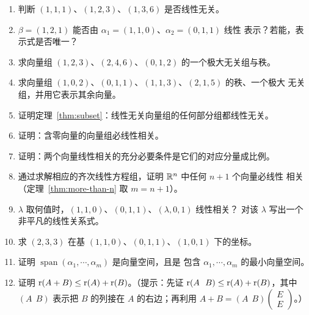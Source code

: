 \begin{enumerate}[label=\arabic*., itemsep=2pt]
\item 判断 $(1,1,1)$、$(1,2,3)$、$(1,3,6)$ 是否线性无关。
\item $\beta=(1,2,1)$ 能否由 $\alpha_1=(1,1,0)$、$\alpha_2=(0,1,1)$ 线性
  表示？若能，表示式是否唯一？
\item 求向量组 $(1,2,3)$、$(2,4,6)$、$(0,1,2)$ 的一个极大无关组与秩。
\item 求向量组 $(1,0,2)$、$(0,1,1)$、$(1,1,3)$、$(2,1,5)$ 的秩、一个极大
  无关组，并用它表示其余向量。
\item 证明定理~\ref{thm:subset}：线性无关向量组的任何部分组都线性无关。
\item 证明：含零向量的向量组必线性相关。
\item 证明：两个向量线性相关的充分必要条件是它们的对应分量成比例。
\item 通过求解相应的齐次线性方程组，证明 $\mathbb{R}^n$ 中任何 $n+1$ 个向量必线性
  相关（定理~\ref{thm:more-than-n} 取 $m=n+1$）。
\item $\lambda$ 取何值时，$(1,1,0)$、$(0,1,1)$、$(\lambda,0,1)$ 线性相关？
  对该 $\lambda$ 写出一个非平凡的线性关系式。
\item 求 $(2,3,3)$ 在基 $(1,1,0)$、$(0,1,1)$、$(1,0,1)$ 下的坐标。
\item 证明 $\operatorname{span}(\alpha_1,\cdots,\alpha_m)$ 是向量空间，且是
  包含 $\alpha_1,\cdots,\alpha_m$ 的最小向量空间。
\item 证明 $\operatorname{r}(A+B)\le\operatorname{r}(A)+\operatorname{r}(B)$。（提示：先证
  $\rank(A\ \ B)\le\rank(A)+\rank(B)$，其中 $(A\ \ B)$ 表示把 $B$ 的列接在
  $A$ 的右边；再利用 $A+B=(A\ \ B)\begin{pmatrix} E \\ E \end{pmatrix}$。）
\end{enumerate}
